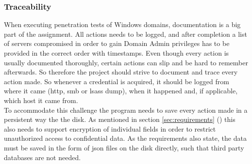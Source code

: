 \documentclass{article}
\begin{document}
\subsubsection{Traceability}
When executing penetration tests of Windows domains, documentation is a big part of the assignment. All actions needs to be logged, and after completion a list of servers compromised in order to gain Domain Admin privileges has to be provided in the correct order with timestamps. Even though every action is usually documented thoroughly, certain actions can slip and be hard to remember afterwards. So therefore the project should strive to document and trace every action made. So whenever a credential is acquired, it should be logged from where it came (\gls{http}, \gls{smb} or \gls{lsass} dump), when it happened and, if applicable, which host it came from.
\\
To accommodate this challenge the program needs to save every action made in a persistent way the the disk. As mentioned in section \ref{sec:requirements} () this also needs to support encryption of individual fields in order to restrict unauthorized access to confidential data. As the requirements also state, the data must be saved in the form of \gls{json} files on the disk directly, such that third party databases are not needed.
\end{document}
